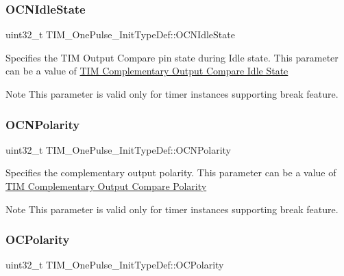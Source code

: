 \subsubsection{\texorpdfstring{O\+C\+N\+Idle\+State}{OCNIdleState}}
{\footnotesize\ttfamily uint32\+\_\+t T\+I\+M\+\_\+\+One\+Pulse\+\_\+\+Init\+Type\+Def\+::\+O\+C\+N\+Idle\+State}

Specifies the T\+IM Output Compare pin state during Idle state. This parameter can be a value of \hyperlink{group___t_i_m___output___compare___n___idle___state}{T\+IM Complementary Output Compare Idle State} \begin{DoxyNote}{Note}
This parameter is valid only for timer instances supporting break feature. 
\end{DoxyNote}
\mbox{\label{struct_t_i_m___one_pulse___init_type_def_a00deac6c3347b0482955d936351c6388}} 
\subsubsection{\texorpdfstring{O\+C\+N\+Polarity}{OCNPolarity}}
{\footnotesize\ttfamily uint32\+\_\+t T\+I\+M\+\_\+\+One\+Pulse\+\_\+\+Init\+Type\+Def\+::\+O\+C\+N\+Polarity}

Specifies the complementary output polarity. This parameter can be a value of \hyperlink{group___t_i_m___output___compare___n___polarity}{T\+IM Complementary Output Compare Polarity} \begin{DoxyNote}{Note}
This parameter is valid only for timer instances supporting break feature. 
\end{DoxyNote}
\mbox{\label{struct_t_i_m___one_pulse___init_type_def_a3028787ad41698072cbf70ddf1b6c984}} 
\subsubsection{\texorpdfstring{O\+C\+Polarity}{OCPolarity}}
{\footnotesize\ttfamily uint32\+\_\+t T\+I\+M\+\_\+\+One\+Pulse\+\_\+\+Init\+Type\+Def\+::\+O\+C\+Polarity}

